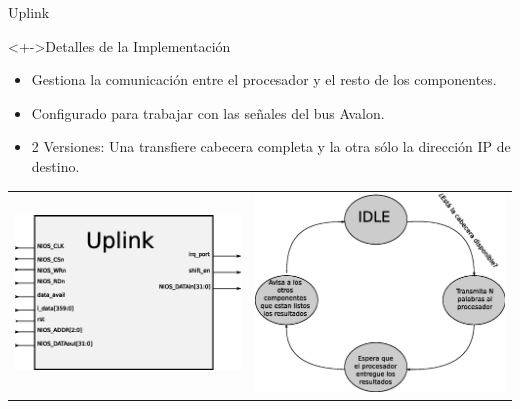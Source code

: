 \documentclass[xcolor=dvipsnames]{beamer}
\begin{document}
\begin{frame}{Uplink}
 \begin{block}<+->{Detalles de la Implementación}
	\begin{itemize}
      \scriptsize
	\item Gestiona la comunicación entre el procesador y el resto de los componentes.
	\item Configurado para trabajar con las señales del bus Avalon.
	\item 2 Versiones: Una transfiere cabecera completa y la otra sólo la dirección IP de destino.
	
	   \end{itemize}
 \begin{tabularx}{\linewidth}{Z|Z}
    \includegraphics[scale=0.35]{figures/bloquplink.eps} 
    &
    \includegraphics[scale=0.30]{figures/estuplink.eps}
    \\
  \end{tabularx}
\end{block}
\end{frame}
\end{document}
